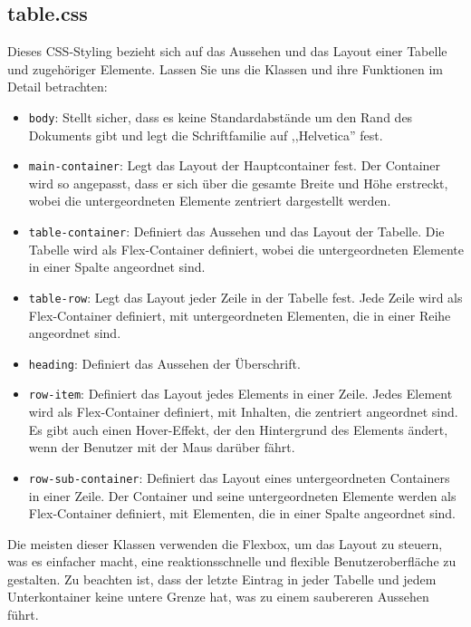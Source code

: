 \documentclass[./dokumentation.tex]{subfiles}
\begin{document}
\subsection{table.css}
Dieses CSS-Styling bezieht sich auf das Aussehen und das Layout einer Tabelle und zugehöriger Elemente. Lassen Sie uns die Klassen und ihre Funktionen im Detail betrachten:\\
\begin{itemize}
    \item \verb+body+: Stellt sicher, dass es keine Standardabstände um den Rand des Dokuments gibt und legt die Schriftfamilie auf ,,Helvetica'' fest.\\
    \item \verb+main-container+: Legt das Layout der Hauptcontainer fest. Der Container wird so angepasst, dass er sich über die gesamte Breite und Höhe erstreckt, wobei die untergeordneten Elemente zentriert dargestellt werden.\\
    \item  \verb+table-container+: Definiert das Aussehen und das Layout der Tabelle. Die Tabelle wird als Flex-Container definiert, wobei die untergeordneten Elemente in einer Spalte angeordnet sind.\\
    \item \verb+table-row+: Legt das Layout jeder Zeile in der Tabelle fest. Jede Zeile wird als Flex-Container definiert, mit untergeordneten Elementen, die in einer Reihe angeordnet sind.\\
    \item \verb+heading+: Definiert das Aussehen der Überschrift.\\
    \item \verb+row-item+: Definiert das Layout jedes Elements in einer Zeile. Jedes Element wird als Flex-Container definiert, mit Inhalten, die zentriert angeordnet sind. Es gibt auch einen Hover-Effekt, der den Hintergrund des Elements ändert, wenn der Benutzer mit der Maus darüber fährt.\\
    \item  \verb+row-sub-container+: Definiert das Layout eines untergeordneten Containers in einer Zeile. Der Container und seine untergeordneten Elemente werden als Flex-Container definiert, mit Elementen, die in einer Spalte angeordnet sind.\\
\end{itemize}
Die meisten dieser Klassen verwenden die Flexbox, um das Layout zu steuern, was es einfacher macht, eine reaktionsschnelle und flexible Benutzeroberfläche zu gestalten. Zu beachten ist, dass der letzte Eintrag in jeder Tabelle und jedem Unterkontainer keine untere Grenze hat, was zu einem saubereren Aussehen führt.
\end{document}
